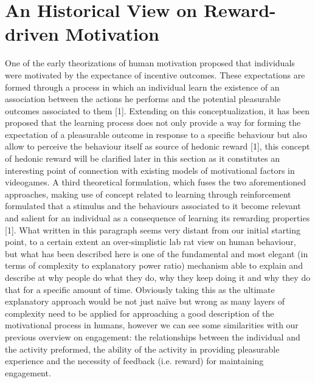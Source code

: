 \section{An Historical View on Reward-driven Motivation}
\label{motivation_hist}
One of the early theorizations of human motivation proposed that individuals were motivated by the expectance of incentive outcomes. These expectations are formed through a process in which an individual learn the existence of an association between the actions he performs and the potential pleasurable outcomes associated to them [1]. Extending on this conceptualization, it has been proposed that the learning process does not only provide a way for forming the expectation of a pleasurable outcome in response to a specific behaviour but also allow to perceive the behaviour itself as source of hedonic reward [1], this concept of hedonic reward will be clarified later in this section as it constitutes an interesting point of connection with existing models of motivational factors in videogames. A third theoretical formulation, which fuses the two aforementioned approaches, making use of  concept related to learning through reinforcement formulated that a stimulus and the behaviours associated to it become relevant and salient for an individual as a consequence of learning its rewarding properties [1]. What written in this paragraph seems very distant from our initial starting point, to a certain extent an over-simplistic lab rat view on human behaviour, but what has been described here is one of the fundamental and most elegant (in terms of complexity to explanatory power ratio) mechanism able to explain and describe at why people do what they do, why they keep doing it and why they do that for a specific amount of time. Obviously taking this as the ultimate explanatory approach would be not just naïve but wrong as many layers of complexity need to be applied for approaching a good description of the motivational process in humans, however we can see some similarities with our previous overview on engagement: the relationships between the individual and the activity preformed, the ability of the activity in providing pleasurable experience and the necessity of feedback (i.e. reward) for maintaining engagement.

